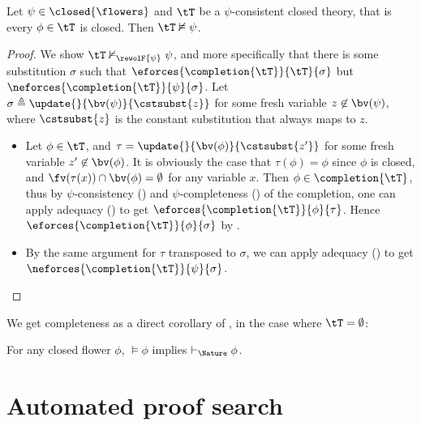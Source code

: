 \begin{lemma}
  
  Let $\psi \in \closed{\flowers}$ and $\tT$ be a $\psi$-consistent closed theory,
  that is every $\phi \in \tT$ is closed. Then $\tT \nvDash \psi$.
\end{lemma}
\begin{proof}
  We show $\tT \nvDash_{\rewolF{\psi}} \psi$, and more specifically that there is
  some substitution $\sigma$ such that $\eforces{\completion{\tT}}{\tT}{\sigma}$ but
  $\neforces{\completion{\tT}}{\psi}{\sigma}$. Let $\sigma \triangleq
  \update{}{\bv(\psi)}{\cstsubst{z}}$ for some fresh variable $z \not\in
  \bv(\psi)$, where $\cstsubst{z}$ is the constant substitution that always maps
  to $z$.
  \begin{itemize}
    \item Let $\phi \in \tT$, and $\tau = \update{}{\bv(\phi)}{\cstsubst{z'}}$ for
    some fresh variable $z' \not\in \bv(\phi)$. It is obviously the case that
    $\tau(\phi) = \phi$ since $\phi$ is closed, and $\fv(\tau(x)) \cap \bv(\phi)
    = \emptyset$ for any variable $x$. Then $\phi \in \completion{\tT}$, thus by
    $\psi$-consistency () and
    $\psi$-completeness () of the completion, one
    can apply adequacy () to get
    $\eforces{\completion{\tT}}{\phi}{\tau}$. Hence
    $\eforces{\completion{\tT}}{\phi}{\sigma}$ by .
    \item By the same argument for $\tau$ transposed to $\sigma$, we can apply
    adequacy () to get
    $\neforces{\completion{\tT}}{\psi}{\sigma}$.
  \end{itemize}
\end{proof}

We get completeness as a direct corollary of , in
the case where $\tT = \emptyset$:

\begin{theorem}[Completeness]
  For any closed flower $\phi$, $\vDash \phi$ implies $\vdash_\Nature \phi$.
\end{theorem}


\section{Automated proof search}



